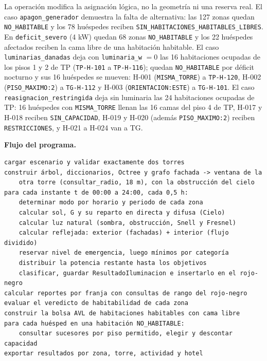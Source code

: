 \documentclass[12pt,a4paper]{article}
\newcommand{\estado}[1]{\texttt{#1}}
\newcommand{\codigo}[1]{\texttt{#1}}
\begin{document}
La operación modifica la asignación lógica, no la geometría ni una reserva real. El caso \codigo{apagon\_generador} demuestra la falta de alternativa: las 127 zonas quedan \estado{NO\_HABITABLE} y los 78 huéspedes reciben \codigo{SIN\_HABITACIONES\_HABITABLES\_LIBRES}. En \codigo{deficit\_severo} (4 kW) quedan 68 zonas \estado{NO\_HABITABLE} y los 22 huéspedes afectados reciben la cama libre de una habitación habitable. El caso \codigo{luminarias\_danadas} deja con \codigo{luminaria\_w} $=0$ las 16 habitaciones ocupadas de los pisos 1 y 2 de TP (\codigo{TP-H-101} a \codigo{TP-H-116}); quedan \estado{NO\_HABITABLE} por déficit nocturno y sus 16 huéspedes se mueven: H-001 (\codigo{MISMA\_TORRE}) a \codigo{TP-H-120}, H-002 (\codigo{PISO\_MAXIMO:2}) a \codigo{TG-H-112} y H-003 (\codigo{ORIENTACION:ESTE}) a \codigo{TG-H-101}. El caso \codigo{reasignacion\_restringida} deja sin luminaria las 24 habitaciones ocupadas de TP: 16 huéspedes con \codigo{MISMA\_TORRE} llenan las 16 camas del piso 4 de TP, H-017 y H-018 reciben \codigo{SIN\_CAPACIDAD}, H-019 y H-020 (además \codigo{PISO\_MAXIMO:2}) reciben \codigo{RESTRICCIONES}, y H-021 a H-024 van a TG.

\textbf{Flujo del programa.}
\begin{verbatim}
cargar escenario y validar exactamente dos torres
construir árbol, diccionarios, Octree y grafo fachada -> ventana de la
    otra torre (consultar_radio, 18 m), con la obstrucción del cielo
para cada instante t de 00:00 a 24:00, cada 0,5 h:
    determinar modo por horario y periodo de cada zona
    calcular sol, G y su reparto en directa y difusa (Cielo)
    calcular luz natural (sombra, obstrucción, Snell y Fresnel)
    calcular reflejada: exterior (fachadas) + interior (flujo dividido)
    reservar nivel de emergencia, luego mínimos por categoría
    distribuir la potencia restante hasta los objetivos
    clasificar, guardar ResultadoIluminacion e insertarlo en el rojo-negro
calcular reportes por franja con consultas de rango del rojo-negro
evaluar el veredicto de habitabilidad de cada zona
construir la bolsa AVL de habitaciones habitables con cama libre
para cada huésped en una habitación NO_HABITABLE:
    consultar sucesores por piso permitido, elegir y descontar capacidad
exportar resultados por zona, torre, actividad y hotel
\end{verbatim}
\end{document}
